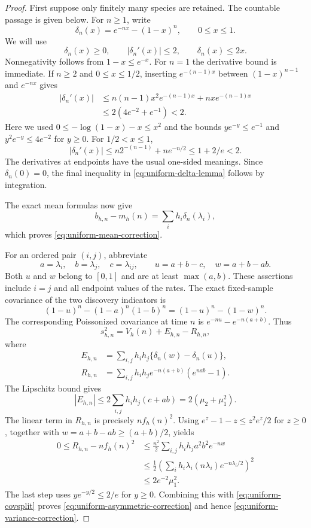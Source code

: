 \documentclass[11pt]{article}
\numberwithin{equation}{section}
\theoremstyle{remark}
\begin{document}
\begin{proof}
First suppose only finitely many species are retained. The countable
passage is given below. For $n\ge1$, write
\[
 \delta_n(x)=e^{-nx}-(1-x)^n,\qquad 0\le x\le1.
\]
We will use
\begin{equation}\label{eq:uniform-delta-lemma}
 \delta_n(x)\ge0,\qquad
 |\delta_n'(x)|\le2,\qquad
 \delta_n(x)\le2x.
\end{equation}
Nonnegativity follows from $1-x\le e^{-x}$. For $n=1$ the derivative bound
is immediate. If $n\ge2$ and $0\le x\le1/2$, inserting
$e^{-(n-1)x}$ between $(1-x)^{n-1}$ and $e^{-nx}$ gives
\begin{align*}
 |\delta_n'(x)|
 &\le n(n-1)x^2e^{-(n-1)x}+nxe^{-(n-1)x}\\
 &\le2(4e^{-2}+e^{-1})<2.
\end{align*}
Here we used $0\le-\log(1-x)-x\le x^2$ and the bounds
$ye^{-y}\le e^{-1}$ and $y^2e^{-y}\le4e^{-2}$ for $y\ge0$.
For $1/2<x\le1$,
\[
 |\delta_n'(x)|
 \le n2^{-(n-1)}+ne^{-n/2}\le1+2/e<2.
\]
The derivatives at endpoints have the usual one-sided meanings. Since
$\delta_n(0)=0$, the final inequality in
\eqref{eq:uniform-delta-lemma} follows by integration.

The exact mean formulas now give
\[
 b_{h,n}-m_h(n)=\sum_i h_i\delta_n(\lambda_i),
\]
which proves \eqref{eq:uniform-mean-correction}.

For an ordered pair $(i,j)$, abbreviate
\[
 a=\lambda_i,\quad b=\lambda_j,\quad c=\lambda_{ij},
 \qquad u=a+b-c,\quad w=a+b-ab.
\]
Both $u$ and $w$ belong to $[0,1]$ and are at least $\max(a,b)$.
These assertions include $i=j$ and all endpoint values of the rates.
The exact fixed-sample covariance of the two discovery indicators is
\[
 (1-u)^n-(1-a)^n(1-b)^n=(1-u)^n-(1-w)^n.
\]
The corresponding Poissonized covariance at time $n$ is
$e^{-nu}-e^{-n(a+b)}$. Thus
\begin{equation}\label{eq:uniform-covsplit}
 s_{h,n}^2=V_h(n)+E_{h,n}-R_{h,n},
\end{equation}
where
\begin{align*}
 E_{h,n}
 &=\sum_{i,j}h_i h_j\{\delta_n(w)-\delta_n(u)\},\\
 R_{h,n}
 &=\sum_{i,j}h_i h_j e^{-n(a+b)}(e^{nab}-1).
\end{align*}
The Lipschitz bound gives
\[
 |E_{h,n}|
 \le2\sum_{i,j}h_i h_j(c+ab)
 =2(\mu_2+\mu_1^2).
\]
The linear term in $R_{h,n}$ is precisely $nf_h(n)^2$. Using
$e^z-1-z\le z^2e^z/2$ for $z\ge0$, together with
$w=a+b-ab\ge(a+b)/2$, yields
\begin{align*}
 0\le R_{h,n}-nf_h(n)^2
 &\le\frac{n^2}{2}\sum_{i,j}h_i h_j a^2b^2e^{-nw}\\
 &\le\frac12
    \left(\sum_i h_i\lambda_i(n\lambda_i)
                              e^{-n\lambda_i/2}\right)^2\\
 &\le2e^{-2}\mu_1^2.
\end{align*}
The last step uses $ye^{-y/2}\le2/e$ for $y\ge0$.
Combining this with \eqref{eq:uniform-covsplit} proves
\eqref{eq:uniform-asymmetric-correction} and hence
\eqref{eq:uniform-variance-correction}.


\end{proof}
\end{document}
